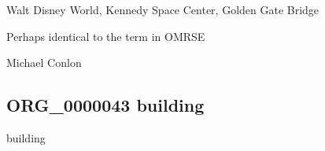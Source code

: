 \documentclass[letterpaper,10pt,english]{sphinxmanual}
\begin{document}
\begin{sphinxShadowBox}

\sphinxAtStartPar
{}
\end{sphinxShadowBox}

\begin{sphinxShadowBox}

\sphinxAtStartPar
Walt Disney World, Kennedy Space Center, Golden Gate Bridge
\end{sphinxShadowBox}

\begin{sphinxShadowBox}

\sphinxAtStartPar
Perhaps identical to the term in OMRSE
\end{sphinxShadowBox}

\begin{sphinxShadowBox}

\sphinxAtStartPar
Michael Conlon 
\end{sphinxShadowBox}

\begin{sphinxShadowBox}

\sphinxAtStartPar
{}
\end{sphinxShadowBox}
\begin{quote}

\ignorespaces \end{quote}


\subsection{ORG\_0000043 \sphinxhyphen{} building}
\label{\detokenize{doc-ORG_0000043:org-0000043-building}}\label{\detokenize{doc-ORG_0000043:index-0}}\label{\detokenize{doc-ORG_0000043::doc}}
\begin{sphinxShadowBox}

\sphinxAtStartPar
building
\end{sphinxShadowBox}

\begin{sphinxShadowBox}

\sphinxAtStartPar
{\hyperref[\detokenize{doc-ORG_0000035::doc}]{}}
\end{sphinxShadowBox}
\end{document}
